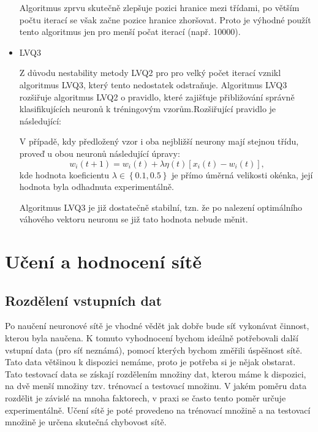 \documentclass[11pt,twoside,a4paper]{book}
\begin{document}
\begin{itemize}
Algoritmus zprvu skutečně zlepšuje pozici hranice mezi třídami, po větším počtu iterací se však začne pozice hranice zhoršovat. Proto je výhodné použít tento algoritmus jen pro menší počat iterací (např. 10000)\cite{courseware}.
\item LVQ3

Z důvodu nestability metody LVQ2 pro pro velký počet iterací vznikl algoritmus LVQ3, který tento nedostatek odstraňuje. Algoritmus LVQ3 rozšiřuje algoritmus LVQ2 o pravidlo, které zajišťuje přibližování správně klasifikujících neuronů k tréningovým vzorům.Rozšiřující pravidlo je následující:

V případě, kdy předložený vzor i oba nejbližší neurony mají stejnou třídu, proveď u obou neuronů následující úpravy:
\begin{equation}
w_{i}(t+1)=w_{i}(t)+\lambda \eta(t)\left[x_{i}(t)-w_{i}(t)\right]\mbox{,}
\end{equation}
kde hodnota koeficientu $\lambda\in\left\lbrace0.1,0.5\right\rbrace$ je přímo úměrná velikosti okénka, její hodnota byla odhadnuta experimentálně.\cite{skripta}

Algoritmus LVQ3 je již dostatečně stabilní, tzn. že po nalezení optimálního váhového vektoru neuronu se již tato hodnota nebude měnit.
\end{itemize}
\chapter{Učení a hodnocení sítě}
\section{Rozdělení vstupních dat}
Po naučení neuronové sítě je vhodné vědět jak dobře bude síť vykonávat činnost, kterou byla naučena. K tomuto vyhodnocení bychom ideálně potřebovali další vstupní data (pro síť neznámá), pomocí kterých bychom změřili úspěšnost sítě. Tato data většinou k dispozici nemáme, proto je potřeba si je nějak obstarat. Tato testovací data se získají rozdělením množiny dat, kterou máme k dispozici, na dvě menší množiny tzv. trénovací a testovací množinu. V jakém poměru data rozdělit je závislé na mnoha faktorech, v praxi se často tento poměr určuje experimentálně. Učení sítě je poté provedeno na trénovací množině a na testovací množině je určena skutečná chybovost sítě.
\end{document}
